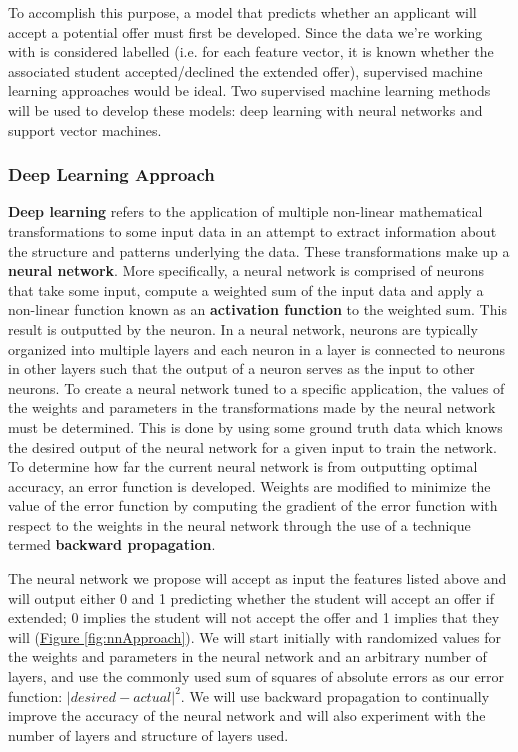 \documentclass{article}
\begin{document}
\begin{normalsize}
            To accomplish this purpose, a model that predicts whether an applicant will accept a potential offer must first be developed.
            Since the data we're working with is considered labelled (i.e. for each feature vector, it is known whether the associated student accepted/declined the extended offer), supervised machine learning approaches would be ideal.
            Two supervised machine learning methods will be used to develop these models: deep learning with neural networks and support vector machines. 
            
            \newpage
            
            \subsubsection{Deep Learning Approach}
            \textbf{Deep learning} refers to the application of multiple non-linear mathematical transformations to some input data in an attempt to extract information about the structure and patterns underlying the data. 
            These transformations make up a \textbf{neural network}. 
            More specifically, a neural network is comprised of neurons that take some input, compute a weighted sum of the input data and apply a non-linear function known as an \textbf{activation function} to the weighted sum.
            This result is outputted by the neuron. 
            In a neural network, neurons are typically organized into multiple layers and each neuron in a layer is connected to neurons in other layers such that the output of a neuron serves as the input to other neurons. 
            To create a neural network tuned to a specific application, the values of the weights and parameters in the transformations made by the neural network must be determined. 
            This is done by using some ground truth data which knows the desired output of the neural network for a given input to train the network. 
            To determine how far the current neural network is from outputting optimal accuracy, an error function is developed. 
            Weights are modified to minimize the value of the error function by computing the gradient of the error function with respect to the weights in the neural network through the use of a technique termed \textbf{backward propagation}. 
            
            The neural network we propose will accept as input the features listed above and will output either 0 and 1 predicting whether the student will accept an offer if extended; 0 implies the student will not accept the offer and 1 implies that they will (\underline{Figure \ref{fig:nnApproach}}).
            We will start initially with randomized values for the weights and parameters in the neural network and an arbitrary number of layers, and use the commonly used sum of squares of absolute errors as our error function:  $\left |desired - actual  \right |^{2}$. 
            We will use backward propagation to continually improve the accuracy of the neural network and will also experiment with the number of layers and structure of layers used.
            

\end{normalsize}
\end{document}
